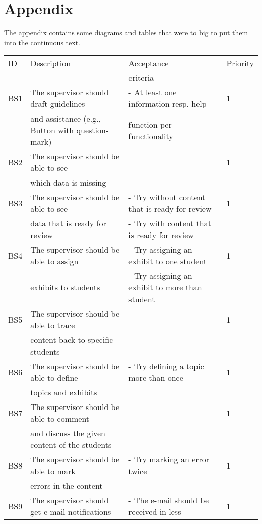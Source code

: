 \chapter{Appendix}
The appendix contains some diagrams and tables that were to big to put them into the continuous text.

\begin{table}[h]
\begin{tabular}{llll}
	\toprule
ID 	& Description 	& Acceptance 	& Priority \\
 	& 			 & criteria 	&  \\
\cmidrule(rl){1-1}\cmidrule(rl){2-2}\cmidrule(rl){3-3}\cmidrule(rl){4-4}
BS1 	& The supervisor should draft guidelines 		& - At least one information resp. help 	& 1	\\
 	& and assistance (e.g., Button with question-mark)	& function per functionality 			& 		\\
\hline
BS2 	& The supervisor should be able to see 	&  	& 1	\\
 	& which data is missing 				&  	& 	\\
\hline
BS3 	& The supervisor should be able to see & - Try without content that is ready for review  & 1\\
 	& data that is ready for review 		& - Try with content that is ready for review & \\
\hline
BS4 	& The supervisor should be able to assign 	& - Try assigning an exhibit to one student & 1\\
 	& exhibits to students 					& - Try assigning an exhibit to more than student & \\
\hline
BS5 	& The supervisor should be able to trace 	&  	& 1\\
 	& content back to specific students 			&  	& \\
\hline
BS6 	& The supervisor should be able to define  	&  - Try defining a topic more than once	& 1\\
 	& topics and exhibits  				    	&  	& \\
\hline
BS7 	& The supervisor should be able to comment 	&  		& 1\\
	& and discuss the given content of the students 	&		& \\	
\hline
BS8 	& The supervisor should be able to mark 	& - Try marking an error twice & 1\\
	& errors in the content					&	& \\
\hline
BS9 	& The supervisor should get e-mail notifications 	& - The e-mail should be received in less  & 1\\

\end{tabular}
\end{table}
